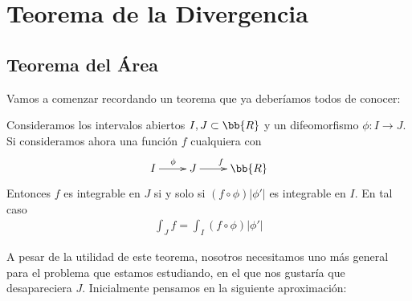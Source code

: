 \section{Teorema de la Divergencia}

\subsection{Teorema del Área}

Vamos a comenzar recordando un teorema que ya deberíamos todos de conocer:

\begin{teo}\label{teo:cambio_variable}
    Consideramos los intervalos abiertos $I,J\subset \bb{R}$ y un difeomorfismo $\phi : I \to J$. Si consideramos ahora una función $f$ cualquiera con
    \begin{gather*}
        \xymatrix{
            I \ar[r]^\phi & J \ar[r]^f & \bb{R}
        }
    \end{gather*}
    Entonces $f$ es integrable en $J$ si y solo si $(f\circ \phi)|\phi'|$ es integrable en $I$. En tal caso
    \begin{gather*}
        \int_J f = \int_I (f \circ \phi)|\phi'|
    \end{gather*}
\end{teo}

A pesar de la utilidad de este teorema, nosotros necesitamos uno más general para el problema que estamos estudiando, en el que nos gustaría que desapareciera $J$. Inicialmente pensamos en la siguiente aproximación:\\

